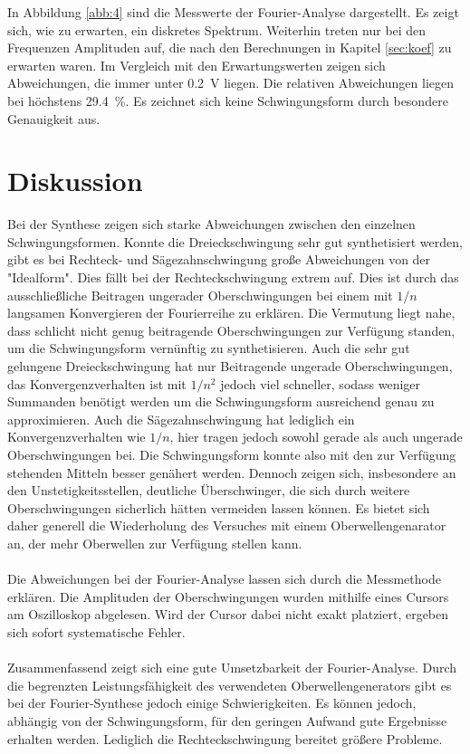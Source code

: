 In Abbildung \ref{abb:4} sind die Messwerte der Fourier-Analyse dargestellt. Es zeigt sich,
wie zu erwarten, ein diskretes Spektrum. Weiterhin treten nur bei den Frequenzen Amplituden
auf, die nach den Berechnungen in Kapitel \ref{sec:koef} zu erwarten waren. Im Vergleich mit den
Erwartungswerten zeigen sich Abweichungen, die immer unter \SI{0.2}{\volt} liegen.
Die relativen Abweichungen liegen bei höchstens \SI{29.4}{\percent}. Es zeichnet sich
keine Schwingungsform durch besondere Genauigkeit aus.
\section{Diskussion}
Bei der Synthese zeigen sich starke Abweichungen zwischen den einzelnen Schwingungsformen.
Konnte die Dreieckschwingung sehr gut synthetisiert werden, gibt es bei Rechteck- und Sägezahnschwingung
große Abweichungen von der "Idealform". Dies fällt bei der Rechteckschwingung extrem auf.
Dies ist durch das ausschließliche Beitragen ungerader Oberschwingungen bei einem mit
$1/n$ langsamen Konvergieren der Fourierreihe zu erklären. Die Vermutung liegt nahe,
dass schlicht nicht genug beitragende Oberschwingungen zur Verfügung standen, um die
Schwingungsform vernünftig zu synthetisieren. Auch die sehr gut gelungene Dreieckschwingung
hat nur Beitragende ungerade Oberschwingungen, das Konvergenzverhalten ist mit $1/n^2$
jedoch viel schneller, sodass weniger Summanden benötigt werden um die Schwingungsform
ausreichend genau zu approximieren. Auch die Sägezahnschwingung hat lediglich ein
Konvergenzverhalten wie $1/n$, hier tragen jedoch sowohl gerade als auch ungerade Oberschwingungen
bei. Die Schwingungsform konnte also mit den zur Verfügung stehenden Mitteln besser genähert werden.
Dennoch zeigen sich, insbesondere an den Unstetigkeitsstellen, deutliche Überschwinger, die
sich durch weitere Oberschwingungen sicherlich hätten vermeiden lassen können. Es bietet sich daher
generell die Wiederholung des Versuches mit einem Oberwellengenarator an, der mehr
Oberwellen zur Verfügung stellen kann.\\
\\
Die Abweichungen bei der Fourier-Analyse lassen sich durch die Messmethode erklären.
Die Amplituden der Oberschwingungen wurden mithilfe eines Cursors am Oszilloskop abgelesen.
Wird der Cursor dabei nicht exakt platziert, ergeben sich sofort systematische Fehler.\\
\\
Zusammenfassend zeigt sich eine gute Umsetzbarkeit der Fourier-Analyse. Durch die begrenzten
Leistungsfähigkeit des verwendeten Oberwellengenerators gibt es bei der Fourier-Synthese
jedoch einige Schwierigkeiten. Es können jedoch, abhängig von der Schwingungsform, für
den geringen Aufwand gute Ergebnisse erhalten werden. Lediglich die Rechteckschwingung
bereitet größere Probleme.
\newpage
\nocite{*}
\printbibliography

